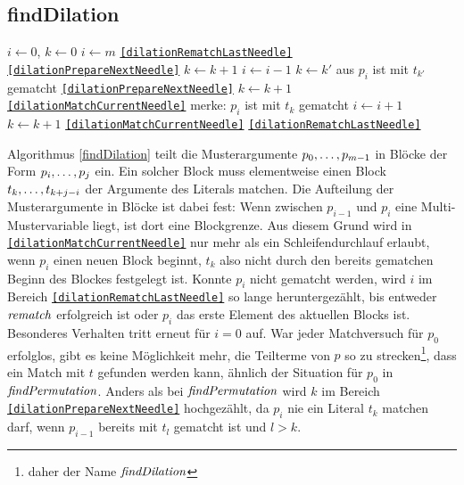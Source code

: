 \subsection {findDilation}
\begin{algorithm}
\DontPrintSemicolon
\caption{$\Const{findDilation} \colon M \times T \times \mathit{Bool} \rightarrow \mathit{Bool}$}\label{findDilation}
\Let $i \leftarrow 0$, $k \leftarrow 0$\;
 {
	$i \leftarrow m$\;
	\Goto \texttt{\ref{dilationRematchLastNeedle}}\;
}
 {
}
 {
}
 \label{dilationMatchCurrentNeedle} 
 {
	 { 
		 {
			\Goto \texttt{\ref{dilationPrepareNextNeedle}}\;
		}
		$k \leftarrow k + 1$\;
	}
}
 \label{dilationRematchLastNeedle} 
 {
	$i \leftarrow i - 1$\;
	{$k \leftarrow k'$ aus \glqq $p_{i}$ ist mit $t_{k'}$ gematcht\grqq{}}\;
	 {
		\Goto \texttt{\ref{dilationPrepareNextNeedle}}\;
	}
	 {
		$k \leftarrow k + 1$\;
	\Goto \texttt{\ref{dilationMatchCurrentNeedle}}\;
	}
}
\;
 \label{dilationPrepareNextNeedle} 
merke: $p_i$ ist mit $t_k$ gematcht\;
$i \leftarrow i + 1$\;
$k \leftarrow k + 1$\;
 {
	\Goto \texttt{\ref{dilationMatchCurrentNeedle}}\;
}
 {
	\Goto \texttt{\ref{dilationRematchLastNeedle}}\;
}
\end{algorithm}


Algorithmus \ref{findDilation} teilt die Musterargumente ${p}_{0}, \dots, {p}_{m-1}$ in Blöcke der Form ${p}_{i}, \dots, {p}_{j}$ ein. Ein solcher Block muss elementweise einen Block ${t}_{k}, \dots, {t}_{k + j - i}$ der Argumente des Literals matchen. Die Aufteilung der Musterargumente in Blöcke ist dabei fest: Wenn zwischen $p_{i-1}$ und $p_{i}$ eine Multi-Mustervariable liegt, ist dort eine Blockgrenze. Aus diesem Grund wird in \texttt{\ref{dilationMatchCurrentNeedle}} nur mehr als ein Schleifendurchlauf erlaubt, wenn $p_i$ einen neuen Block beginnt, $t_k$ also nicht durch den bereits gematchen Beginn des Blockes festgelegt ist. 
Konnte $p_i$ nicht gematcht werden, wird  $i$ im Bereich \texttt{\ref{dilationRematchLastNeedle}} so lange heruntergezählt, bis entweder $\mathit{rematch}$ erfolgreich ist oder $p_i$ das erste Element des aktuellen Blocks ist. Besonderes Verhalten tritt erneut für $i = 0$ auf. War jeder Matchversuch für $p_0$ erfolglos, gibt es keine Möglichkeit mehr, die Teilterme von $p$ so zu \glqq strecken\grqq{}\footnote{daher der Name $\mathit{findDilation}$}, dass ein Match mit $t$ gefunden werden kann, ähnlich der Situation für $p_0$ in $\mathit{findPermutation}$. Anders als bei $\mathit{findPermutation}$ wird $k$ im Bereich \texttt{\ref{dilationPrepareNextNeedle}} hochgezählt, da $p_i$ nie ein Literal $t_k$ matchen darf, wenn $p_{i-1}$ bereits mit $t_l$ gematcht ist und $l > k$.


